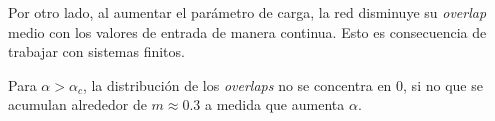 Por otro lado, al aumentar el parámetro de carga, la red disminuye su \textit{overlap} medio con los valores de entrada de manera continua. Esto es consecuencia de trabajar con sistemas finitos.

Para $\alpha > \alpha_{c}$, la distribución de los \textit{overlaps} no se concentra en $0$, si no que se acumulan alrededor de $m \approx 0.3$ a medida que aumenta $\alpha$. 